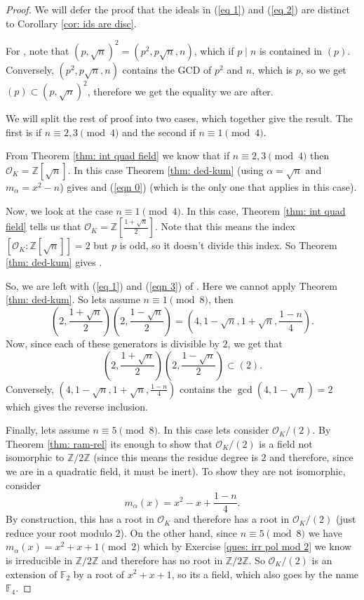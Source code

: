 \documentclass[11pt,a4paper]{report}
\theoremstyle{plain}
\theoremstyle{definition}
\theoremstyle{definition}
\newcommand{\ZZ}{\mathbb{Z}}
\def\FF{\mathbb{F}}
\def \a{\alpha}
\def \OO {\mathcal{O}}
\begin{document}
	\begin{proof}
		
		We will defer the proof that the ideals in  (\ref{eq 1}) and (\ref{eq 2})	are distinct to Corollary \ref{cor: ids are disc}.
		
		For \faShip, note that $(p,\sqrt{n})^2=(p^2,p\sqrt{n},n)$, which if $p \mid n$ is contained in $(p)$. Conversely,	$(p^2,p\sqrt{n},n)$ contains the GCD of $p^2$ and $n$, which is $p$, so we get $(p) \subset (p,\sqrt{n})^2$, therefore we get the equality we are after.
		
		We will split the rest of proof into two cases, which together give the result. The first is if $n \equiv 2,3 \pmod 4$ and the second if $n \equiv 1 \pmod 4$.	
		
		From Theorem \ref{thm: int quad field} we know that if $n \equiv 2,3 \pmod 4$ then $\OO_K=\ZZ[\sqrt{n}]$. In this case Theorem \ref{thm: ded-kum} (using $\a=\sqrt{n}$ and $m_\a=x^2-n$) gives \faKey and (\ref{eqn 0}) (which is the only one that applies in this case).
		
		Now, we look at the case $n \equiv 1 \pmod 4$. In this case, Theorem \ref{thm: int quad field} tells us that $\OO_K=\ZZ[\frac{1+\sqrt{n}}{2}]$. Note that this means the index $[\OO_K:\ZZ[\sqrt{n}]]=2$ but $p$ is odd, so it doesn't divide this index. So Theorem \ref{thm: ded-kum}  gives \faKey.
		
		So, we are left with (\ref{eq 1}) and (\ref{eqn 3}) of \faLeaf. Here we cannot apply Theorem \ref{thm: ded-kum}. So lets assume $n \equiv 1 \pmod 8$, then  \[ 	\left (2,\frac{1+\sqrt{n}}{2}\right )\left (2,\frac{1-\sqrt{n}}{2}\right )=\left(4,1-\sqrt{n},1+\sqrt{n},\frac{1-n}{4}\right).\]  Now, since each of these generators is divisible by $2$, we get that  	\[\left(2,\frac{1+\sqrt{n}}{2}\right)\left(2,\frac{1-\sqrt{n}}{2}\right) \subset (2).\] Conversely, $\left(4,1-\sqrt{n},1+\sqrt{n},\frac{1-n}{4}\right)$ contains the $\gcd(4,1-\sqrt{n})=2$ which gives the reverse inclusion. 
		
		Finally, lets assume $n \equiv 5 \pmod 8$. In this case lets consider $\OO_K/(2)$. By Theorem \ref{thm: ram-rel} its enough to show that $\OO_K/(2)$ is a field not isomorphic to $\ZZ/2\ZZ$ (since this means the residue degree is $2$ and therefore, since we are in a quadratic field, it must be inert). To show they are not isomorphic, consider \[m_\a(x)=x^2-x+\frac{1-n}{4}.\] By construction, this has a root in $\OO_K$ and therefore has a root in $\OO_K/(2)$ (just reduce your root modulo $2$). On the other hand, since $n \equiv 5 \pmod 8$ we have $m_\a(x)=x^2+x+1 \pmod 2$ which by  Exercise \ref{ques: irr pol mod 2} we know is irreducible in $\ZZ/2\ZZ$ and therefore has no root in $\ZZ/2\ZZ$. So $\OO_K/(2)$ is an extension of $\FF_2$ by a root of $x^2+x+1$, so its a field, which also goes by the name $\FF_4$. 
		
		
		
		
	\end{proof}
	
\end{document}
